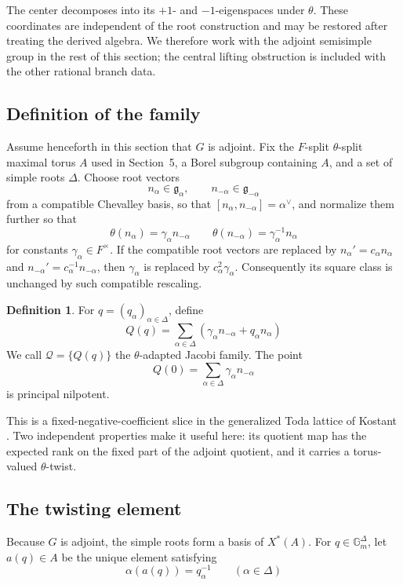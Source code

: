 \documentclass[11pt]{amsart}
\theoremstyle{definition}
\newtheorem{definition}[definition]{Definition}
\theoremstyle{remark}
\newcommand{\cQ}{\mathcal Q}
\newcommand{\Gm}{\mathbb G_m}
\newcommand{\g}{\mathfrak g}
\begin{document}
The center decomposes into its $+1$- and $-1$-eigenspaces under $\theta$.  These
coordinates are independent of the root construction and may be restored
after treating the derived algebra.  We therefore work with the adjoint
semisimple group in the rest of this section; the central lifting obstruction
is included with the other rational branch data.

\subsection{Definition of the family}
Assume henceforth in this section that $G$ is adjoint.  Fix the $F$-split $\theta$-split maximal torus $A$ used in Section~5, a
Borel subgroup containing $A$, and a set of simple roots $\Delta$.  Choose root vectors
\[
 n_\alpha\in\g_\alpha,
 \qquad n_{-\alpha}\in\g_{-\alpha}
\]
from a compatible Chevalley basis, so that
$[n_\alpha,n_{-\alpha}]=\alpha^\vee$, and normalize them further so that
\begin{equation}\label{eq:theta-root-vectors}
 \theta(n_\alpha)=\gamma_\alpha n_{-\alpha}
 \qquad
 \theta(n_{-\alpha})=\gamma_\alpha^{-1}n_\alpha
\end{equation}
for constants $\gamma_\alpha\in F^\times$.  If the compatible root
vectors are replaced by
$n_\alpha' =c_\alpha n_\alpha$ and
$n_{-\alpha}'=c_\alpha^{-1}n_{-\alpha}$, then
$\gamma_\alpha$ is replaced by $c_\alpha^2\gamma_\alpha$.
Consequently its square class is unchanged by such compatible rescaling.

\begin{definition}\label{def:jacobi-family}
For $q=(q_\alpha)_{\alpha\in\Delta}$, define
\begin{equation}\label{eq:jacobi-family}
 Q(q)=\sum_{\alpha\in\Delta}
 \left(\gamma_\alpha n_{-\alpha}+q_\alpha n_\alpha\right)
\end{equation}
We call $\cQ=\{Q(q)\}$ the $\theta$-adapted Jacobi family.  The point
\[
 Q(0)=\sum_{\alpha\in\Delta}\gamma_\alpha n_{-\alpha}
\]
is principal nilpotent.
\end{definition}

This is a fixed-negative-coefficient slice in the generalized Toda lattice of
Kostant \cite{KostantToda}.  Two independent properties make it useful here:
its quotient map has the expected rank on the fixed part of the adjoint
quotient, and it carries a torus-valued $\theta$-twist.

\subsection{The twisting element}
Because $G$ is adjoint, the simple roots form a basis of $X^*(A)$.  For
$q\in\Gm^\Delta$, let $a(q)\in A$ be the unique element satisfying
\begin{equation}\label{eq:a-q}
 \alpha(a(q))=q_\alpha^{-1}
 \qquad(\alpha\in\Delta)
\end{equation}
\end{document}
